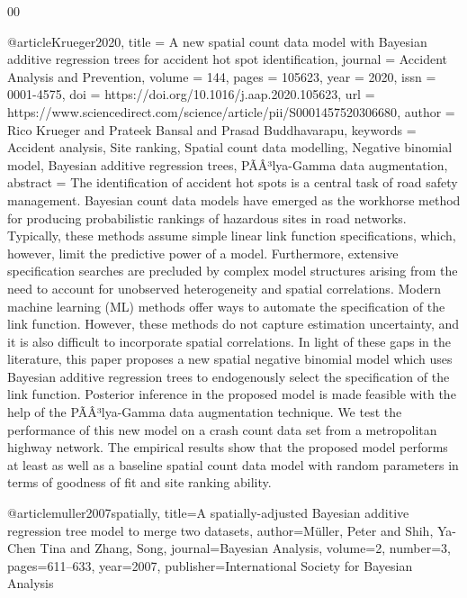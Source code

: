 \documentclass[preprint,12pt]{elsarticle}
\begin{document}
\begin{thebibliography}{00}
{@article{Krueger2020,
title = {{A new spatial count data model with Bayesian additive regression trees for accident hot spot identification}},
journal = {Accident Analysis and Prevention},
volume = {144},
pages = {105623},
year = {2020},
issn = {0001-4575},
doi = {https://doi.org/10.1016/j.aap.2020.105623},
url = {https://www.sciencedirect.com/science/article/pii/S0001457520306680},
author = {Rico Krueger and Prateek Bansal and Prasad Buddhavarapu},
keywords = {Accident analysis, Site ranking, Spatial count data modelling, Negative binomial model, Bayesian additive regression trees, PÃÂ³lya-Gamma data augmentation},
abstract = {The identification of accident hot spots is a central task of road safety management. Bayesian count data models have emerged as the workhorse method for producing probabilistic rankings of hazardous sites in road networks. Typically, these methods assume simple linear link function specifications, which, however, limit the predictive power of a model. Furthermore, extensive specification searches are precluded by complex model structures arising from the need to account for unobserved heterogeneity and spatial correlations. Modern machine learning (ML) methods offer ways to automate the specification of the link function. However, these methods do not capture estimation uncertainty, and it is also difficult to incorporate spatial correlations. In light of these gaps in the literature, this paper proposes a new spatial negative binomial model which uses Bayesian additive regression trees to endogenously select the specification of the link function. Posterior inference in the proposed model is made feasible with the help of the PÃÂ³lya-Gamma data augmentation technique. We test the performance of this new model on a crash count data set from a metropolitan highway network. The empirical results show that the proposed model performs at least as well as a baseline spatial count data model with random parameters in terms of goodness of fit and site ranking ability.}
}

@article{muller2007spatially,
  title={{A spatially-adjusted Bayesian additive regression tree model to merge two datasets}},
  author={M{\"u}ller, Peter and Shih, Ya-Chen Tina and Zhang, Song},
  journal={Bayesian Analysis},
  volume={2},
  number={3},
  pages={611--633},
  year={2007},
  publisher={International Society for Bayesian Analysis}
}

}
\end{thebibliography}
\end{document}
